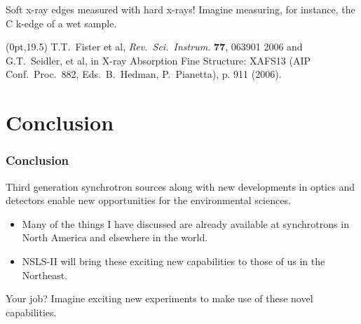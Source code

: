 \documentclass[10pt, xcolor=x11names, compress]{beamer}
\begin{document}
\begin{frame}
  \smallskip

  \begin{exampleblock}{Soft x-ray edges measured with hard x-rays!}
    Imagine measuring, for instance, the C k-edge of a wet sample.
  \end{exampleblock}

  \begin{textblock*}{0.6\linewidth}(0pt,19.5\TPVertModule) \tiny
    \tiny
    T.T.\ Fister et al, \textit{Rev.\ Sci.\ Instrum.}
    \textbf{77}, 063901 2006 and G.T.\ Seidler, et al, in X-ray
    Absorption Fine Structure: XAFS13 (AIP Conf.\ Proc.\ 882,
    Eds.\ B.\ Hedman, P.\ Pianetta), p. 911 (2006).
  \end{textblock*}
\end{frame}

\section[Conclusion]{Conclusion}
\begin{frame}
  \frametitle{Conclusion}

  Third generation synchrotron sources along with new developments in
  optics and detectors enable new opportunities for the environmental
  sciences.

  \bigskip

  \begin{itemize}
  \item Many of the things I have discussed are already available at
    synchrotrons in North America and elsewhere in the world.
  \item NSLS-II will bring these exciting new capabilities to those of
    us in the Northeast.
  \end{itemize}

  \bigskip

  \begin{exampleblock}{Your job?}
    Imagine exciting new experiments to make use of these novel capabilities.
  \end{exampleblock}
\end{frame}
\end{document}

